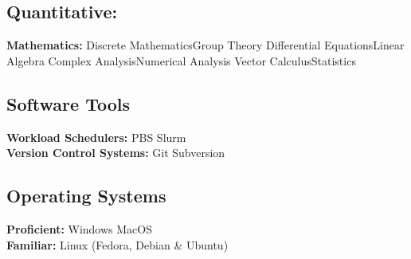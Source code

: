 \documentclass[letterpaper]{deedy-resume} %
\begin{document}
\begin{minipage}[t]{0.32\textwidth}
\sectionspace

\subsection{Quantitative:}
\textbf{Mathematics:}
\textbullet{}Discrete Mathematics\textbullet{}Group Theory
\textbullet{}Differential Equations\textbullet{}Linear Algebra
\textbullet{}Complex Analysis\textbullet{}Numerical Analysis
\textbullet{}Vector Calculus\textbullet{}Statistics

\sectionspace

\subsection{Software Tools}
\textbf{Workload Schedulers:} PBS \textbullet{} Slurm\\
\textbf{Version Control Systems:} Git \textbullet{} Subversion

\sectionspace

\subsection{Operating Systems}
\textbf{Proficient:} Windows \textbullet{} MacOS\\
\textbf{Familiar:} Linux (Fedora, Debian \& Ubuntu)


\end{minipage} %
%
%
\vspace{0pt}
\end{document}
